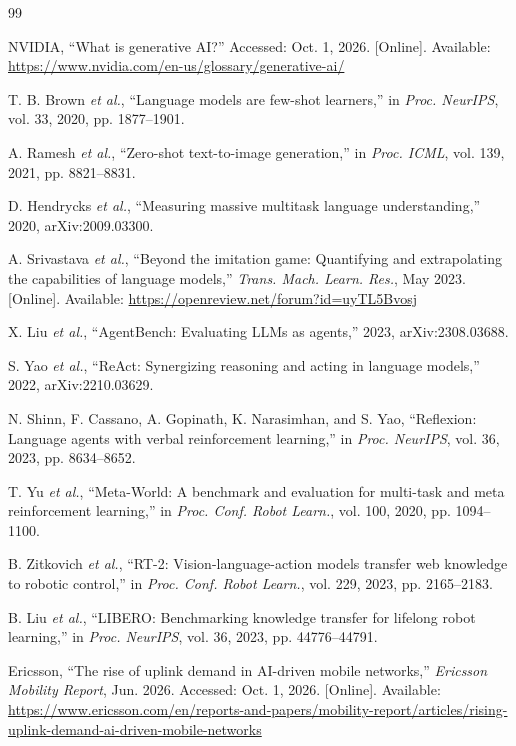 \documentclass[letterpaper,journal]{IEEEtran}
\newcommand{\etal}{\emph{et al.}}
\begin{document}
\begin{thebibliography}{99}

NVIDIA, ``What is generative AI?'' Accessed: Oct. 1, 2026. [Online]. Available:
\url{https://www.nvidia.com/en-us/glossary/generative-ai/}

T. B. Brown \etal, ``Language models are few-shot learners,'' in
\emph{Proc. NeurIPS}, vol. 33, 2020, pp. 1877--1901.

A. Ramesh \etal, ``Zero-shot text-to-image generation,'' in \emph{Proc. ICML},
vol. 139, 2021, pp. 8821--8831.

D. Hendrycks \etal, ``Measuring massive multitask language understanding,''
2020, arXiv:2009.03300.

A. Srivastava \etal, ``Beyond the imitation game: Quantifying and extrapolating
the capabilities of language models,'' \emph{Trans. Mach. Learn. Res.},
May 2023. [Online]. Available: \url{https://openreview.net/forum?id=uyTL5Bvosj}

X. Liu \etal, ``AgentBench: Evaluating LLMs as agents,'' 2023,
arXiv:2308.03688.

S. Yao \etal, ``ReAct: Synergizing reasoning and acting in language models,''
2022, arXiv:2210.03629.

N. Shinn, F. Cassano, A. Gopinath, K. Narasimhan, and S. Yao, ``Reflexion:
Language agents with verbal reinforcement learning,'' in \emph{Proc. NeurIPS},
vol. 36, 2023, pp. 8634--8652.

T. Yu \etal, ``Meta-World: A benchmark and evaluation for multi-task and
meta reinforcement learning,'' in \emph{Proc. Conf. Robot Learn.}, vol. 100, 2020,
pp. 1094--1100.

B. Zitkovich \etal, ``RT-2: Vision-language-action models transfer web
knowledge to robotic control,'' in \emph{Proc. Conf. Robot Learn.}, vol. 229, 2023,
pp. 2165--2183.

B. Liu \etal, ``LIBERO:
Benchmarking knowledge transfer for lifelong robot learning,'' in
\emph{Proc. NeurIPS}, vol. 36, 2023, pp. 44776--44791.

Ericsson, ``The rise of uplink demand in AI-driven mobile networks,''
\emph{Ericsson Mobility Report}, Jun. 2026. Accessed: Oct. 1, 2026.
[Online]. Available:
\begingroup\def\UrlBreaks{\do\/\do-}%
\url{https://www.ericsson.com/en/reports-and-papers/mobility-report/articles/rising-uplink-demand-ai-driven-mobile-networks}\endgroup


\end{thebibliography}
\end{document}
